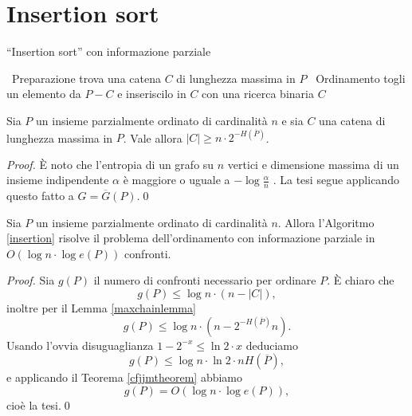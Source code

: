 \section{Insertion sort} 
\begin{algorithm}
  \caption{``Insertion sort'' con informazione parziale} \label{insertion} 
  \begin{algorithmic}
    [1] \STATE \, \COMMENT Preparazione \STATE trova una catena \(C\) di lunghezza massima in \(P\) \STATE \, \COMMENT Ordinamento  \STATE togli un elemento da \(P-C\) e inseriscilo in \(C\) con una ricerca binaria \ENDWHILE \RETURN \(C\) 
  \end{algorithmic}
\end{algorithm}
\begin{lemma}
  \label{maxchainlemma} Sia \(P\) un insieme parzialmente ordinato di cardinalità \(n\) e sia \(C\) una catena di lunghezza massima in \(P\). Vale allora \(\left|C\right|\ge n\cdot2^{-H(\overline{P})}\). 
\end{lemma}
\begin{proof}
  È noto che l'entropia di un grafo su \(n\) vertici e dimensione massima di un insieme indipendente \(\alpha\) è maggiore o uguale a \(-\log{\frac{\alpha}{n}}\) \cite{Cardinal2005}. La tesi segue applicando questo fatto a \(G=\overline{G}(P)\).\qed 
\end{proof}
\begin{theorem}
  Sia \(P\) un insieme parzialmente ordinato di cardinalità \(n\). Allora l'Algoritmo \ref{insertion} risolve il problema dell'ordinamento con informazione parziale in \(O(\log{n}\cdot\log{e(P)})\) confronti. 
\end{theorem}
\begin{proof}
  Sia \(g(P)\) il numero di confronti necessario per ordinare \(P\). È chiaro che
  \[g(P)\le \log{n}\cdot(n-|C|),\]
  inoltre per il Lemma \ref{maxchainlemma}
  \[g(P)\le\log{n}\cdot(n-2^{-H(\overline{P})}n).\]
  Usando l'ovvia disuguaglianza \(1-2^{-x}\le\ln{2}\cdot x\) deduciamo
  \[g(P)\le\log{n}\cdot\ln{2}\cdot nH(\overline{P}),\]
  e applicando il Teorema \ref{cfjjmtheorem} abbiamo
  \[g(P)=O(\log{n}\cdot\log{e(P)}),\]
  cioè la tesi.\qed 
\end{proof}

\newpage

